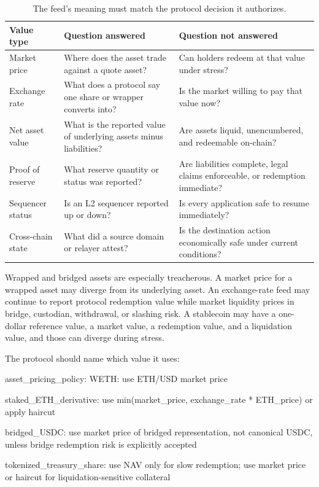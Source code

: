 \begin{table}[htbp]
\centering
\small
\renewcommand{\arraystretch}{1.16}
\begin{tabularx}{\textwidth}{@{}>{\RaggedRight\arraybackslash}p{}>{\RaggedRight\arraybackslash}p{}X@{}}
\toprule
Value type & Question answered & Question not answered \\
\midrule
Market price & Where does the asset trade against a quote asset? & Can holders redeem at that value under stress? \\
Exchange rate & What does a protocol say one share or wrapper converts into? & Is the market willing to pay that value now? \\
Net asset value & What is the reported value of underlying assets minus liabilities? & Are assets liquid, unencumbered, and redeemable on-chain? \\
Proof of reserve & What reserve quantity or status was reported? & Are liabilities complete, legal claims enforceable, or redemption immediate? \\
Sequencer status & Is an L2 sequencer reported up or down? & Is every application safe to resume immediately? \\
Cross-chain state & What did a source domain or relayer attest? & Is the destination action economically safe under current conditions? \\
\bottomrule
\end{tabularx}
\caption{The feed's meaning must match the protocol decision it authorizes.}
\end{table}

Wrapped and bridged assets are especially treacherous. A market price for a wrapped asset may diverge from its underlying asset. An exchange-rate feed may continue to report protocol redemption value while market liquidity prices in bridge, custodian, withdrawal, or slashing risk. A stablecoin may have a one-dollar reference value, a market value, a redemption value, and a liquidation value, and those can diverge during stress.

The protocol should name which value it uses:

\begin{codeblock}
asset_pricing_policy:
    WETH:
        use ETH/USD market price

    staked_ETH_derivative:
        use min(market_price, exchange_rate * ETH_price) or apply haircut

    bridged_USDC:
        use market price of bridged representation, not canonical USDC,
        unless bridge redemption risk is explicitly accepted

    tokenized_treasury_share:
        use NAV only for slow redemption; use market price or haircut
        for liquidation-sensitive collateral
\end{codeblock}

